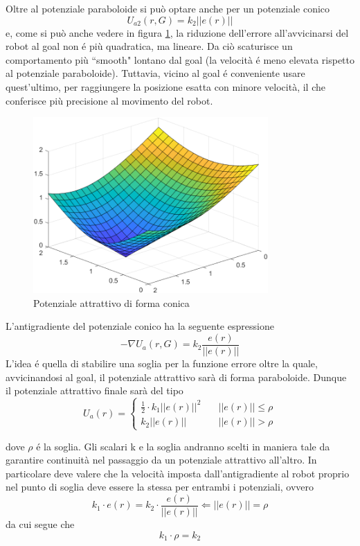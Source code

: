 \documentclass[14pt,a4paper]{extarticle}
\begin{document}
\begin{description}
Oltre al potenziale paraboloide si può optare anche per un potenziale conico 
\begin{equation}
U_{a2}(r,G) = k_2||e(r)||
\end{equation}
e, come si può anche vedere in figura \ref{potACon}, la riduzione dell'errore all'avvicinarsi del robot al goal non é più quadratica, ma lineare. Da ciò scaturisce un comportamento più ``smooth" lontano dal goal (la velocità é meno elevata rispetto al potenziale paraboloide). Tuttavia, vicino al goal é conveniente usare quest'ultimo, per raggiungere la posizione esatta con minore velocità, il che conferisce più precisione al movimento del robot. 
\begin{figure}[H]
\centering
\caption{Potenziale attrattivo di forma conica}
\label{potACon}
\includegraphics[width=0.8\textwidth]{potACon.png}
\end{figure}
L'antigradiente del potenziale conico ha la seguente espressione
\begin{equation}
-\nabla U_a(r,G) = k_2\frac{e(r)}{||e(r)||}
\end{equation}
L'idea é quella di stabilire una soglia per la funzione errore oltre la quale, avvicinandosi al goal, il potenziale attrattivo sarà di forma paraboloide. 
Dunque il potenziale attrattivo finale sarà del tipo
\begin{equation}
\label{potAC}
U_a(r) = 
\begin{cases}
\frac{1}{2} \cdot k_1 ||e(r)||^2 \quad &||e(r)|| \leq \rho \\
k_2||e(r)|| \quad &||e(r)|| > \rho
\end{cases}
\end{equation}

dove \(\rho\) é la soglia.  Gli scalari k e la soglia andranno scelti in maniera tale da garantire continuità nel passaggio da un potenziale attrattivo all'altro. In particolare deve valere che la velocità imposta dall'antigradiente al robot proprio nel punto di soglia deve essere la stessa per entrambi i potenziali, ovvero
\[k_1 \cdot e(r) = k_2 \cdot \frac{e(r)}{||e(r)||} \Leftarrow ||e(r)|| = \rho\]
da cui segue che 
\begin{equation}
\label{parconswitch}
k_1 \cdot \rho = k_2 
\end{equation}


\end{description}
\end{document}
